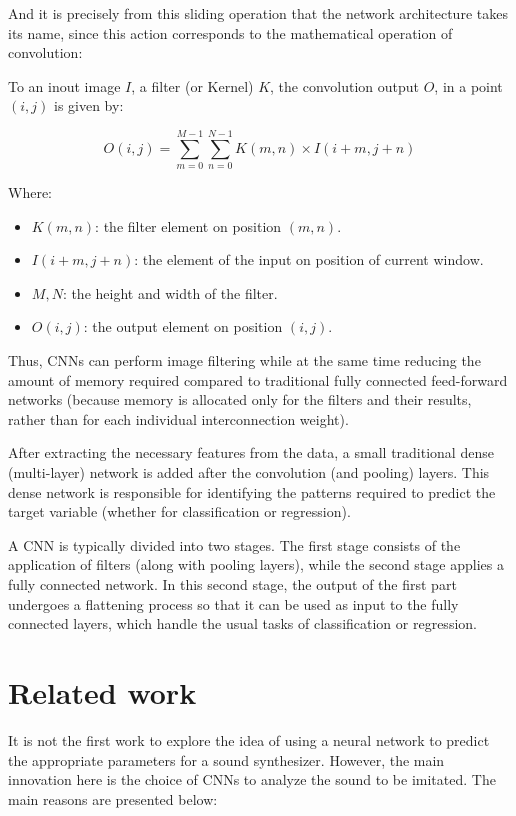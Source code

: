 \documentclass[sigconf,natbib=false]{acmart}
\begin{document}
And it is precisely from this sliding operation that the network architecture takes its name, since this action corresponds to the mathematical operation of convolution:

To an inout image \( I \), a filter (or Kernel) \( K \), the convolution output \( O \), in a point \( (i,j) \) is given by:

\[
O(i,j) = \sum_{m=0}^{M-1} \sum_{n=0}^{N-1} K(m,n) \times I(i+m, j+n)
\]

Where:

\begin{itemize}
\item \( K(m,n) \): the filter element on position \( (m,n) \).
\item \( I(i+m, j+n) \): the element of the input on position of current window.
\item \( M, N \): the height and width of the filter.
\item \( O(i,j) \): the output element on position \( (i,j) \).
\end{itemize}

Thus, CNNs can perform image filtering while at the same time reducing the amount of memory required compared to traditional fully connected feed-forward networks (because memory is allocated only for the filters and their results, rather than for each individual interconnection weight).

After extracting the necessary features from the data, a small traditional dense (multi-layer) network is added after the convolution (and pooling) layers. This dense network is responsible for identifying the patterns required to predict the target variable (whether for classification or regression).

A CNN is typically divided into two stages. The first stage consists of the application of filters (along with pooling layers), while the second stage applies a fully connected network. In this second stage, the output of the first part undergoes a flattening process so that it can be used as input to the fully connected layers, which handle the usual tasks of classification or regression.

\section{Related work}

It is not the first work to explore the idea of using a neural network to predict the appropriate parameters for a sound synthesizer. However, the main innovation here is the choice of CNNs to analyze the sound to be imitated. The main reasons are presented below:
\end{document}
